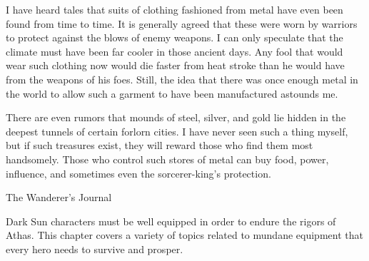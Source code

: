 {I have heard tales that suits of clothing fashioned from metal have even been found from time to time. It is generally agreed that these were worn by warriors to protect against the blows of enemy weapons. I can only speculate that the climate must have been far cooler in those ancient days. Any fool that would wear such clothing now would die faster from heat stroke than he would have from the weapons of his foes. Still, the idea that there was once enough metal in the world to allow such a garment to have been manufactured astounds me.

There are even rumors that mounds of steel, silver, and gold lie hidden in the deepest tunnels of certain forlorn cities. I have never seen such a thing myself, but if such treasures exist, they will reward those who find them most handsomely. Those who control such stores of metal can buy food, power, influence, and sometimes even the sorcerer-king's protection.}
{The Wanderer's Journal}

{\tableheader Dark Sun} characters must be well equipped in order to endure the rigors of Athas. This chapter covers a variety of topics related to mundane equipment that every hero needs to survive and prosper.












